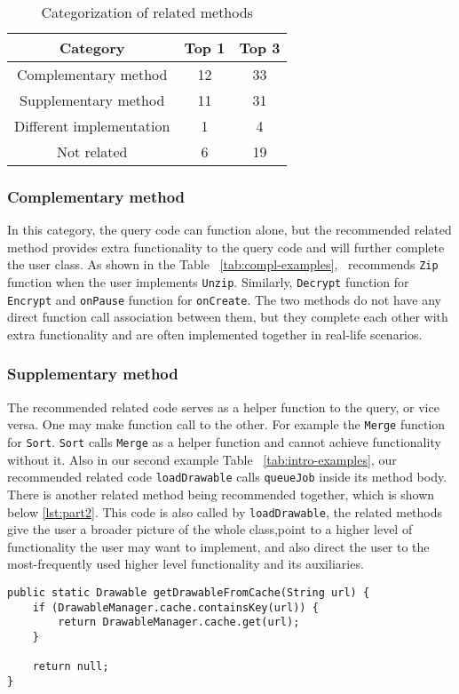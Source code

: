 \begin{table}
	\begin{center}
		\begin{tabular}{ c|c|c } 
			Category & Top 1 & Top 3 \\\hline
			Complementary method &  12 & 33\\\hline 
			Supplementary method &  11 & 31 \\ \hline
			Different implementation &  1 & 4 \\ \hline
			Not related &6 & 19
		\end{tabular}		
	\end{center}
	\caption{Categorization of related methods}
	\label{tab:categorization}
\end{table}
	
	

\subsubsection{Complementary method} In this category, the query code can function alone, but the recommended related method provides extra functionality to the query code and will further complete the user class. As shown in the Table ~\ref{tab:compl-examples}, \tool\ recommends \texttt{Zip} function when the user implements \texttt{Unzip}. Similarly, \texttt{Decrypt} function for \texttt{Encrypt} and \texttt{onPause} function for \texttt{onCreate}. The two methods do not have any direct function call association between them, but they complete each other with extra functionality and are often implemented together in real-life scenarios. 

\subsubsection{Supplementary method} The recommended related code serves as a helper function to the query, or vice versa. One may make function call to the other. For example the \texttt{Merge} function for \texttt{Sort}. \texttt{Sort} calls \texttt{Merge} as a helper function and cannot achieve functionality without it. Also in our second example Table ~\ref{tab:intro-examples}, our recommended related code \texttt{loadDrawable} calls \texttt{queueJob} inside its method body. There is another related method being recommended together, which is shown below \ref{lst:part2}. This code is also called by \texttt{loadDrawable}, the related methods give the user a broader picture of the whole class,point to a higher level of functionality the user may want to implement, and also direct the user to the most-frequently used higher level functionality and its auxiliaries.
\begin{lstlisting}[caption={Recommended code \#2}, label={lst:part2}]
public static Drawable getDrawableFromCache(String url) {
	if (DrawableManager.cache.containsKey(url)) {
		return DrawableManager.cache.get(url);
	}
	
	return null;
}	
\end{lstlisting}

